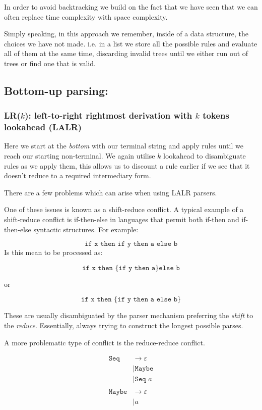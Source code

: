 \documentclass{article}
\renewcommand{\i}[1]{\textit{#1}}
\newcommand{\rarr}{\rightarrow}
\begin{document}
In order to avoid backtracking we build on the fact that we have seen that we can often replace time complexity with space complexity.

Simply speaking, in this approach we remember, inside of a data structure, the choices we have not made. i.e. in a list we store all the possible rules and evaluate all of them at the same time, discarding invalid trees until we either run out of trees or find one that is valid.
\subsection{Bottom-up parsing:}
\subsubsection{LR($k$): left-to-right rightmost derivation with $k$ tokens lookahead (LALR)}

Here we start at the \i{bottom} with our terminal string and apply rules until we reach our starting non-terminal. We again utilise $k$ lookahead to disambiguate rules as we apply them, this allows us to discount a rule earlier if we see that it doesn't reduce to a required intermediary form.

There are a few problems which can arise when using LALR parsers. 

One of these issues is known as a shift-reduce conflict. A typical example of a shift-reduce conflict is if-then-else in languages that permit both if-then and if-then-else syntactic structures. For example:

$$
\texttt{if x then if y then a else b}
$$
Is this mean to be processed as:

$$
\texttt{if x then \{if y then a\} else b}
$$

or 

$$
\texttt{if x then \{if y then a else b\}}
$$

These are usually disambiguated by the parser mechanism preferring the \i{shift} to the \i{reduce}. Essentially, always trying to construct the longest possible parses.

A more problematic type of conflict is the reduce-reduce conflict.

\begin{align*}
    \texttt{Seq} &\rarr \varepsilon \\
        &| \texttt{Maybe} \\
        &| \texttt{Seq }a \\
        \\
    \texttt{Maybe} &\rarr \varepsilon \\
          &| a
\end{align*}
\end{document}
